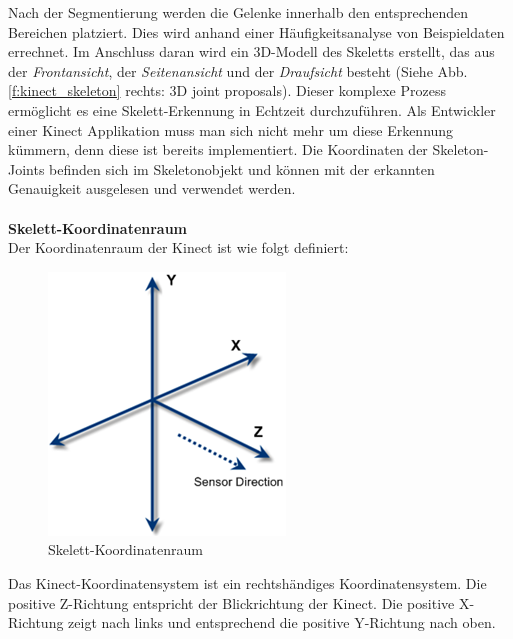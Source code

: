 \noindent
Nach der Segmentierung werden die Gelenke innerhalb den entsprechenden Bereichen platziert. Dies wird anhand einer Häufigkeitsanalyse von Beispieldaten errechnet.
Im Anschluss daran wird ein 3D-Modell des Skeletts erstellt, das aus der \textit{Frontansicht}, der \textit{Seitenansicht} und der \textit{Draufsicht} besteht (Siehe Abb. \ref{f:kinect_skeleton} rechts: 3D joint proposals).
Dieser komplexe Prozess ermöglicht es eine Skelett-Erkennung in Echtzeit durchzuführen. Als Entwickler einer Kinect Applikation muss man sich nicht mehr um diese Erkennung kümmern, denn diese  ist bereits implementiert.
Die Koordinaten der Skeleton-Joints befinden sich im Skeletonobjekt und können mit der erkannten Genauigkeit ausgelesen und verwendet werden.
\\ \\
\textbf{Skelett-Koordinatenraum}\\
Der Koordinatenraum der Kinect ist wie folgt definiert:

\begin{figure}[H]						
	\centering							
	\includegraphics[scale=0.8]{Bilder/kinect_skeleton_space.png}			
	\caption{Skelett-Koordinatenraum\cite{ws:microsoft_coordinateSpaces}}						
	\label{f:kinect_skeleton_space}						
\end{figure}

\noindent
Das Kinect-Koordinatensystem ist ein rechtshändiges Koordinatensystem. Die positive Z-Richtung entspricht der Blickrichtung der Kinect. Die positive X-Richtung zeigt nach links und entsprechend die positive Y-Richtung nach oben. \cite{ws:microsoft_coordinateSpaces}

